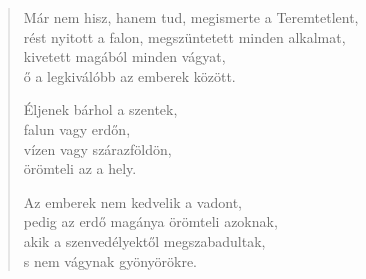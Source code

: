 \begin{verse}
 Már nem hisz, hanem tud, megismerte a Teremtetlent,\\
rést nyitott a falon, megszüntetett minden alkalmat,\\
kivetett magából minden vágyat,\\
ő a legkiválóbb az emberek között.

 Éljenek bárhol a szentek,\\
falun vagy erdőn,\\
vízen vagy szárazföldön,\\
örömteli az a hely.

 Az emberek nem kedvelik a vadont,\\
pedig az erdő magánya örömteli azoknak,\\
akik a szenvedélyektől megszabadultak,\\
s nem vágynak gyönyörökre.

\end{verse}

